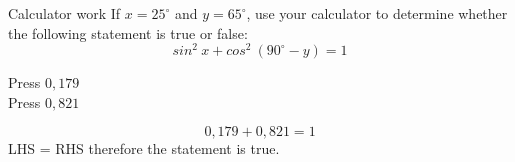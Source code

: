 \begin{wex}
{Calculator work}
{If $x=25^{\circ}$ and $y=65^{\circ}$, use your calculator to determine whether the following statement is true or false:
\begin{equation*}
sin^{2}~x + cos^{2}~(90^{\circ}-y) = 1
\end{equation*}
}
{
Press \fbox{(}   \fbox{)}   \fbox{\LARGE =} $0,179$\\
Press \fbox{(}  \fbox{(}  \fbox{\LARGE -}  \fbox{)} \fbox{)}   \fbox{\LARGE =} $0,821$

\begin{equation*}
 0,179+0,821 = 1
\end{equation*}
LHS = RHS therefore the statement is true.



}
\end{wex}

